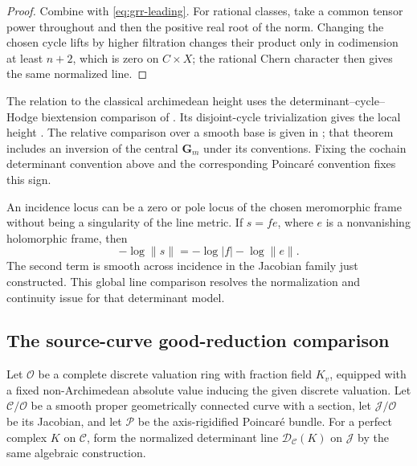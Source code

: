 \documentclass[11pt,a4paper]{article}
\newtheorem{proposition}[theorem]{Proposition}
\theoremstyle{definition}
\theoremstyle{remark}
\newcommand{\cD}{\mathcal D}
\newcommand{\MathEqref}[1]{\eqref{#1}}
\begin{document}
\begin{proof}
Combine  with
\MathEqref{eq:grr-leading}. For rational classes, take a common
tensor power throughout and then the positive real root of the
norm. Changing the chosen cycle lifts by higher filtration changes
their product only in codimension at least \(n+2\), which is
zero on \(C\times X\); the rational Chern character then gives
the same normalized line.
\end{proof}

The relation to the classical archimedean height uses the
determinant--cycle--Hodge biextension comparison of
\cite[Propositions~4.3, 4.29, 4.31 and Corollary~4.32]{Gorchinskiy}.
Its disjoint-cycle trivialization gives the local height
\cite[Remark~4.7]{Gorchinskiy}. The relative comparison over a
smooth base is given in \cite[Theorem~10.9]{Nakayama}; that theorem
includes an inversion of the central \(\mathbf G_m\) under its
conventions. Fixing the cochain determinant convention above and
the corresponding Poincaré convention fixes this sign.

An incidence locus can be a zero or pole locus of the chosen
meromorphic frame without being a singularity of the line metric.
If \(s=fe\), where \(e\) is a nonvanishing holomorphic frame, then
\[
 -\log\|s\|=-\log|f|-\log\|e\|.
\]
The second term is smooth across incidence in the Jacobian family
just constructed. This global line comparison resolves the
normalization and continuity issue for that determinant model.

\subsection{The source-curve good-reduction comparison}
\label{sec:good-reduction-metric}

Let \(\mathcal O\) be a complete discrete valuation ring with
fraction field \(K_v\), equipped with a fixed non-Archimedean
absolute value inducing the given discrete valuation.
Let \(\mathcal C/\mathcal O\) be a smooth proper geometrically
connected curve with a section, let \(\mathcal J/\mathcal O\)
be its Jacobian, and let \(\mathcal P\) be the axis-rigidified
Poincaré bundle. For a perfect complex \(K\) on \(\mathcal C\),
form the normalized determinant line \(\cD_{\mathcal C}(K)\)
on \(\mathcal J\) by the same algebraic construction.

\end{document}
